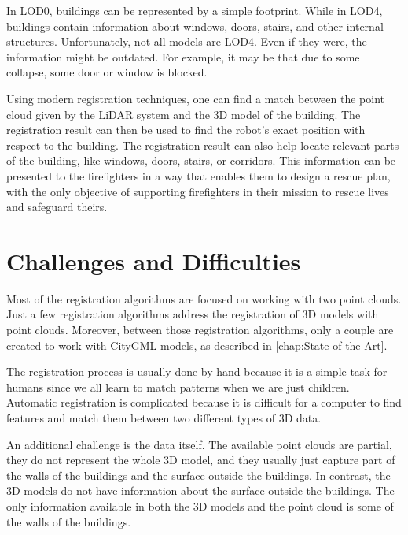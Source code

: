         In LOD0, buildings can be represented by a simple footprint. While in LOD4, buildings contain information about windows, doors, stairs, and other internal structures.
        Unfortunately, not all models are LOD4. Even if they were, the information might be outdated. For example, it may be that due to some collapse, some door or window is blocked.
        \par
        Using modern registration techniques, one can find a match between the point cloud given by the LiDAR system and the 3D model of the building.
        The registration result can then be used to find the robot’s exact position with respect to the building.
        The registration result can also help locate relevant parts of the building, like windows, doors, stairs, or corridors.
        This information can be presented to the firefighters in a way that enables them to design a rescue plan, with the only objective of 
        supporting firefighters in their mission to rescue lives and safeguard theirs.

    \section{Challenges and Difficulties}
    
        Most of the registration algorithms are focused on working with two point clouds.
        Just a few registration algorithms address the registration of 3D models with point clouds.
        Moreover, between those registration algorithms, only a couple are created to work with CityGML models, as described in \autoref{chap:State of the Art}.
        \par      
        The registration process is usually done by hand because it is a simple task for humans since we all learn to match patterns when we are just children. 
        Automatic registration is complicated because it is difficult for a computer to find features and match them between two different types of 3D data.
        \par
        An additional challenge is the data itself. The available point clouds are partial, they do not represent the whole 3D model, 
        and they usually just capture part of the walls of the buildings and the surface outside the buildings. 
        In contrast, the 3D models do not have information about the surface outside the buildings. 
        The only information available in both the 3D models and the point cloud is some of the walls of the buildings.
        \par
        

